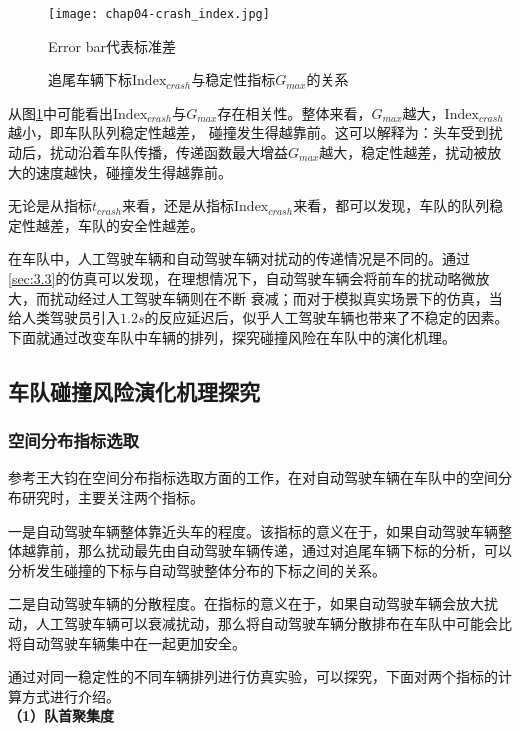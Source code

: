 \begin{figure}
    \centering
    \texttt{[image: chap04-crash\_index.jpg]}
    \caption*{Error bar代表标准差}
    \caption{追尾车辆下标$\mathrm{Index}_{crash}$与稳定性指标$G_{max}$的关系}
    \label{fig:chap04-4}
\end{figure} 

从图\ref{fig:chap04-4}中可能看出$\mathrm{Index}_{crash}$与$G_{max}$存在相关性。整体来看，$G_{max}$越大，$\mathrm{Index}_{crash}$越小，即车队队列稳定性越差，
碰撞发生得越靠前。这可以解释为：头车受到扰动后，扰动沿着车队传播，传递函数最大增益$G_{max}$越大，稳定性越差，扰动被放大的速度越快，碰撞发生得越靠前。

无论是从指标$t_{crash}$来看，还是从指标$\mathrm{Index}_{crash}$来看，都可以发现，车队的队列稳定性越差，车队的安全性越差。

在车队中，人工驾驶车辆和自动驾驶车辆对扰动的传递情况是不同的。通过\ref{sec:3.3}的仿真可以发现，在理想情况下，自动驾驶车辆会将前车的扰动略微放大，而扰动经过人工驾驶车辆则在不断
衰减；而对于模拟真实场景下的仿真，当给人类驾驶员引入$1.2s$的反应延迟后，似乎人工驾驶车辆也带来了不稳定的因素。下面就通过改变车队中车辆的排列，探究碰撞风险在车队中的演化机理。

\subsection{车队碰撞风险演化机理探究}
\label{sec:4.2.4}

\subsubsection{空间分布指标选取}
\label{sec:4.2.4.1}

参考王大钧在空间分布指标选取方面的工作\cite{wang2021auto}，在对自动驾驶车辆在车队中的空间分布研究时，主要关注两个指标。

一是自动驾驶车辆整体靠近头车的程度。该指标的意义在于，如果自动驾驶车辆整体越靠前，那么扰动最先由自动驾驶车辆传递，通过对追尾车辆下标的分析，可以分析发生碰撞的下标与自动驾驶整体分布的下标之间的关系。

二是自动驾驶车辆的分散程度。在指标的意义在于，如果自动驾驶车辆会放大扰动，人工驾驶车辆可以衰减扰动，那么将自动驾驶车辆分散排布在车队中可能会比将自动驾驶车辆集中在一起更加安全。

通过对同一稳定性的不同车辆排列进行仿真实验，可以探究，下面对两个指标的计算方式进行介绍。 \\

\noindent \textbf{（1）队首聚集度}

